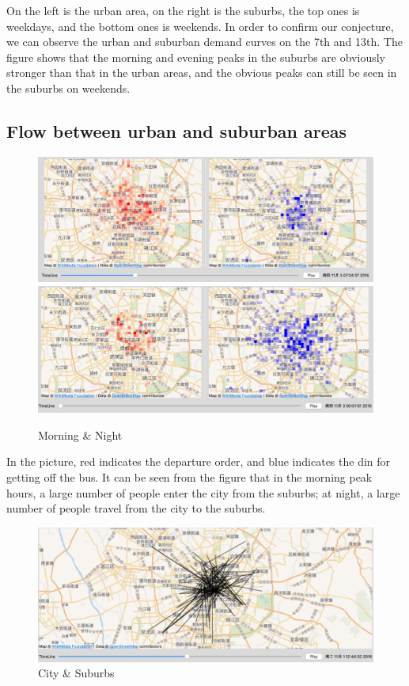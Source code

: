 \documentclass{article}
\begin{document}
On the left is the urban area, on the right is the suburbs, the top ones is weekdays, and the bottom ones is weekends. In order to confirm our conjecture, we can observe the urban and suburban demand curves on the 7th and 13th. The figure shows that the morning and evening peaks in the suburbs are obviously stronger than that in the urban areas, and the obvious peaks can still be seen in the suburbs on weekends.

\subsection{Flow between urban and suburban areas}
\setlength{\parindent}{0em}
\begin{figure}[htbp] 
	\centering 
	\includegraphics[scale=0.09]{morning.jpg}
	\includegraphics[scale=0.09]{night.jpg}
	\caption{Morning \& Night}
\end{figure}
\setlength{\parindent}{2em}
In the picture, red indicates the departure order, and blue indicates the din for getting off the bus. It can be seen from the figure that in the morning peak hours, a large number of people enter the city from the suburbs; at night, a large number of people travel from the city to the suburbs.

\newpage

\setlength{\parindent}{0em}
\begin{figure}[htbp] 
	\centering 
	\includegraphics[scale=0.14]{flow.jpg}
	\caption{City \& Suburbs}
\end{figure}
\setlength{\parindent}{2em}
\end{document}
